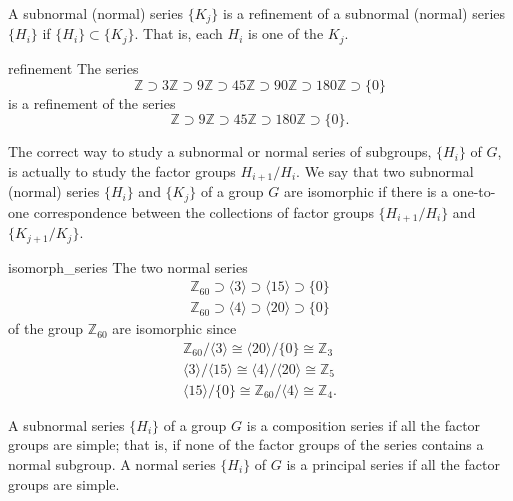 
A subnormal (normal) series $\{ K_j \}$ is a {\bfi refinement of a
subnormal (normal) series\/} $\{ H_i \}$ if $\{ H_i \} \subset \{ K_j
\}$. That is, each $H_i$ is one of the $K_j$. 
 

\begin{example}{refinement}
The series
\[
{\mathbb Z} \supset 3{\mathbb Z} \supset 9{\mathbb Z} \supset 45{\mathbb Z}
\supset 90{\mathbb Z} \supset 180{\mathbb Z} \supset \{0\}
\]
is a refinement of the series
\[
{\mathbb Z} \supset 9{\mathbb Z} \supset 45{\mathbb Z} \supset 180{\mathbb Z} 
\supset \{0\}.
\]
\end{example}

 
The correct way to study a subnormal or normal series of subgroups,
$\{ H_i \}$ of $G$, is actually to study the factor groups
$H_{i+1}/H_i$.  We say that two subnormal (normal) series $\{H_i \}$
and $\{ K_j \}$ of a group $G$ are {\bfi isomorphic\/} if there is a
one-to-one correspondence between the collections of factor groups
$\{H_{i+1}/H_i \}$ and $\{ K_{j+1}/ K_j \}$. 
 

\begin{example}{isomorph_series}
The two normal series
\begin{gather*}
{\mathbb Z}_{60} \supset \langle 3 \rangle \supset  \langle 15 \rangle
\supset \{ 0 \} \\
{\mathbb Z}_{60} \supset \langle 4 \rangle \supset  \langle 20 \rangle
\supset \{ 0 \}
\end{gather*}
of the group ${\mathbb Z}_{60}$ are isomorphic since
\begin{gather*}
{\mathbb Z}_{60} / \langle 3 \rangle \cong \langle 20 \rangle /
\{ 0 \} \cong {\mathbb Z}_{3}
\\
\langle 3 \rangle / \langle 15 \rangle
\cong \langle 4 \rangle /  \langle 20 \rangle \cong {\mathbb Z}_{5}
\\
\langle 15 \rangle / \{ 0 \} \cong {\mathbb Z}_{60} / \langle 4 \rangle
\cong {\mathbb Z}_4.
\end{gather*}
\end{example}
 

A subnormal series $\{ H_i \}$ of a group $G$ is a {\bfi composition
series\/} if all the factor groups are 
simple; that is, if none of the factor groups of the series contains a
normal subgroup. A normal series $\{ H_i \}$ of $G$ is a {\bfi 
principal series\/} if all the factor groups 
are simple.  
 
 
 
